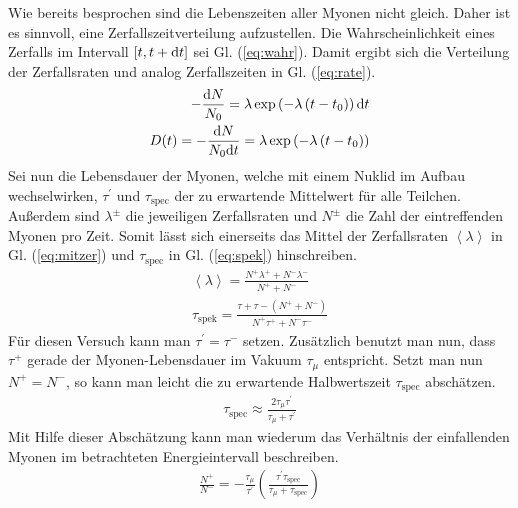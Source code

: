 \documentclass[numbers=noenddot,12pt,a4paper]{scrartcl}
\newcommand{\diff}{\textnormal{d}}
\newcommand{\ix}[1]{_\text{#1}}
\begin{document}
Wie bereits besprochen sind die Lebenszeiten aller Myonen nicht gleich. Daher ist es sinnvoll, eine Zerfallszeitverteilung aufzustellen. Die Wahrscheinlichkeit eines Zerfalls im Intervall $\left[t,t+\diff t\right]$ sei Gl. (\ref{eq:wahr}). Damit ergibt sich die Verteilung der Zerfallsraten und analog Zerfallszeiten in Gl. (\ref{eq:rate}).
\begin{align}
	-\frac{\diff N}{N\ix{0}}=\lambda\exp\left(-\lambda \left(t-t\ix{0}\right)\right)\diff t \label{eq:wahr}\\
	D(t)=-\frac{\diff N}{N\ix{0}\diff t}=\lambda\exp\left(-\lambda \left(t-t\ix{0}\right)\right) \label{eq:rate}
\end{align}
Sei nun die Lebensdauer der Myonen, welche mit einem Nuklid im Aufbau wechselwirken, $\tau^\prime$ und $\tau\ix{spec}$ der zu erwartende Mittelwert für alle Teilchen. Außerdem sind $\lambda^\pm$ die jeweiligen Zerfallsraten und $N^\pm$ die Zahl der eintreffenden Myonen pro Zeit. Somit lässt sich einerseits das Mittel der Zerfallsraten $\left\langle\lambda\right\rangle$ in Gl. (\ref{eq:mitzer}) und $\tau\ix{spec}$ in Gl. (\ref{eq:spek}) hinschreiben.
\begin{align}
	\left\langle\lambda\right\rangle=\frac{N^+\lambda^++N^-\lambda^-}{N^++N^-} \label{eq:mitzer} \\
	\tau\ix{spek}=\frac{\tau+\tau-\left(N^++N^-\right)}{N^+\tau^++N^-\tau^-} \label{eq:spek}
\end{align}
Für diesen Versuch kann man $\tau^\prime=\tau^-$ setzen. Zusätzlich benutzt man nun, dass $\tau^+$ gerade der Myonen-Lebensdauer im Vakuum $\tau_{\mu}$ entspricht.
Setzt man nun $N^+=N^-$, so kann man leicht die zu erwartende Halbwertszeit $\tau\ix{spec}$ abschätzen.
\begin{align}
	\tau\ix{spec}\approx\frac{2\tau_\mu\tau^\prime}{\tau_\mu+\tau^\prime}
\end{align}
\newpage
Mit Hilfe dieser Abschätzung kann man wiederum das Verhältnis der einfallenden Myonen im betrachteten Energieintervall beschreiben.
\begin{align}
	\frac{N^+}{N^-}=-\frac{\tau_\mu}{\tau^\prime}\left(\frac{\tau^\prime\tau\ix{spec}}{\tau_\mu+\tau\ix{spec}}\right)
\end{align}
\end{document}
